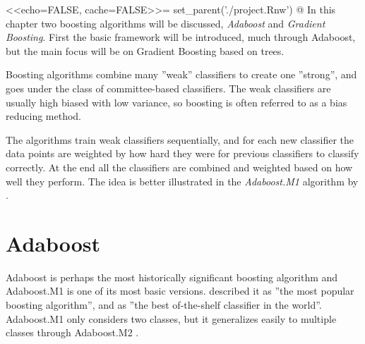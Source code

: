 <<echo=FALSE, cache=FALSE>>=
set_parent('./project.Rnw')
@
In this chapter two boosting algorithms will be discussed, \textit{Adaboost} and \textit{Gradient Boosting}. First the basic framework will be introduced, much through Adaboost, but the main focus will be on Gradient Boosting based on trees. 

Boosting algorithms combine many ''weak'' classifiers to create one ''strong'', and goes under the class of committee-based classifiers. The weak classifiers are usually high biased with low variance, so boosting is often referred to as a bias reducing method. 

The algorithms train weak classifiers sequentially, and for each new classifier the data points are weighted by how hard they were for previous classifiers to classify correctly. At the end all the classifiers are combined and weighted based on how well they perform. The idea is better illustrated in the \textit{Adaboost.M1} algorithm by  \cite{adaboostM1}.
\section{Adaboost}
\label{sec:Adaboost}
Adaboost is perhaps the most historically significant boosting algorithm and Adaboost.M1 is one of its most basic versions. \cite{modstat} described it as ''the most popular boosting algorithm'', and \cite{Breiman1996} as ''the best of-the-shelf classifier in the world''. Adaboost.M1 only considers two classes, but it generalizes easily to multiple classes through Adaboost.M2 \citep{adaboostM1}. 


